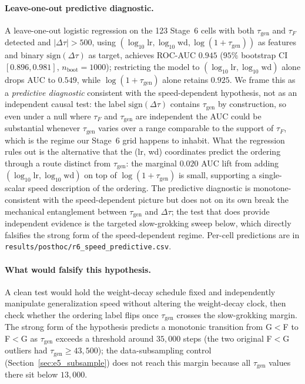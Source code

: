 \documentclass{article}
\newcommand{\taug}{\tau_{\mathrm{gen}}}
\newcommand{\tauf}{\tau_{F}}
\newcommand{\Dtau}{\Delta\tau}
\begin{document}
\paragraph{Leave-one-out predictive diagnostic.}
A leave-one-out logistic regression on the 123 Stage~6 cells with
both $\taug$ and $\tauf$ detected and $|\Dtau|>500$, using
$(\log_{10}\mathrm{lr}, \log_{10}\mathrm{wd}, \log(1+\taug))$ as
features and binary $\mathrm{sign}(\Dtau)$ as target, achieves
ROC-AUC $0.945$ ($95\%$ bootstrap CI $[0.896, 0.981]$,
$n_{\mathrm{boot}}{=}1000$); restricting the model to
$(\log_{10}\mathrm{lr}, \log_{10}\mathrm{wd})$ alone drops AUC to
$0.549$, while $\log(1+\taug)$ alone retains $0.925$.
We frame this as a \emph{predictive diagnostic} consistent with
the speed-dependent hypothesis, not as an independent causal
test: the label $\mathrm{sign}(\Dtau)$ contains $\taug$ by
construction, so even under a null where $\tauf$ and $\taug$ are
independent the AUC could be substantial whenever $\taug$ varies
over a range comparable to the support of $\tauf$, which is the
regime our Stage~6 grid happens to inhabit.
What the regression rules out is the alternative that the
(lr, wd) coordinates predict the ordering through a route
distinct from $\taug$: the marginal $0.020$ AUC lift from adding
$(\log_{10}\mathrm{lr}, \log_{10}\mathrm{wd})$ on top of
$\log(1+\taug)$ is small, supporting a single-scalar speed
description of the ordering.
The predictive diagnostic is monotone-consistent with the
speed-dependent picture but does not on its own break the
mechanical entanglement between $\taug$ and $\Dtau$; the test
that does provide independent evidence is the targeted
slow-grokking sweep below, which directly falsifies the strong
form of the speed-dependent regime.
Per-cell predictions are in
\texttt{results/posthoc/r6\_speed\_predictive.csv}.

\paragraph{What would falsify this hypothesis.}
A clean test would hold the weight-decay schedule fixed and
independently manipulate generalization speed without altering the
weight-decay clock, then check whether the ordering label flips
once $\taug$ crosses the slow-grokking margin.
The strong form of the hypothesis predicts a monotonic transition
from G$<$F to F$<$G as $\taug$ exceeds a threshold around
$35{,}000$ steps (the two original F$<$G outliers had
$\taug\geq 43{,}500$); the data-subsampling control
(Section~\ref{sec:e5_subsample}) does not reach this margin
because all $\taug$ values there sit below $13{,}000$.
\end{document}
